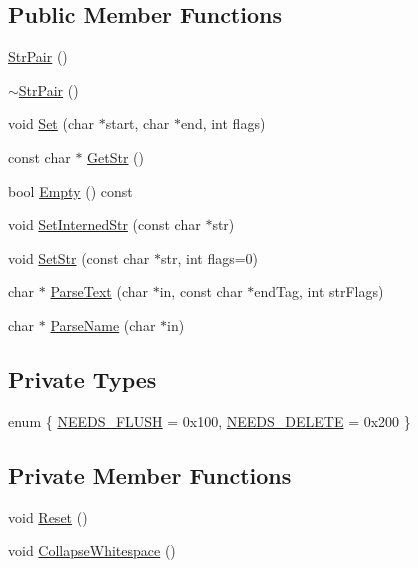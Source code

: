 \subsection*{Public Member Functions}
\begin{DoxyCompactItemize}
\item 
\hyperlink{classtinyxml2_1_1_str_pair_a69153963f7052de9f767d3d8c1623a70}{Str\-Pair} ()
\item 
\hyperlink{classtinyxml2_1_1_str_pair_a60bed84d2503296e1c2a73fcef1431f9}{$\sim$\-Str\-Pair} ()
\item 
void \hyperlink{classtinyxml2_1_1_str_pair_a4f05549373394266a1eecba26813c166}{Set} (char $\ast$start, char $\ast$end, int flags)
\item 
const char $\ast$ \hyperlink{classtinyxml2_1_1_str_pair_ad87e3d11330f5e689ba1e7e54c023b57}{Get\-Str} ()
\item 
bool \hyperlink{classtinyxml2_1_1_str_pair_affa1043e73a18f05d5d2faec055725a7}{Empty} () const 
\item 
void \hyperlink{classtinyxml2_1_1_str_pair_a2baf6230e18333e02ab65d0897ee3941}{Set\-Interned\-Str} (const char $\ast$str)
\item 
void \hyperlink{classtinyxml2_1_1_str_pair_a1f82ec6b5bee35ee7466d8565e43b1de}{Set\-Str} (const char $\ast$str, int flags=0)
\item 
char $\ast$ \hyperlink{classtinyxml2_1_1_str_pair_ad90521f188e9606a8fbafe5d86fb2246}{Parse\-Text} (char $\ast$in, const char $\ast$end\-Tag, int str\-Flags)
\item 
char $\ast$ \hyperlink{classtinyxml2_1_1_str_pair_aa6d8998efceba41d87ec2300c70a6085}{Parse\-Name} (char $\ast$in)
\end{DoxyCompactItemize}
\subsection*{Private Types}
\begin{DoxyCompactItemize}
\item 
enum \{ \hyperlink{classtinyxml2_1_1_str_pair_a476a92d76f24486c3ae4731916b12aaea2d8841daedc3955ed20ec9f760318434}{N\-E\-E\-D\-S\-\_\-\-F\-L\-U\-S\-H} = 0x100, 
\hyperlink{classtinyxml2_1_1_str_pair_a476a92d76f24486c3ae4731916b12aaeab9a3152ce5df9e7f4bbf3774fe862c75}{N\-E\-E\-D\-S\-\_\-\-D\-E\-L\-E\-T\-E} = 0x200
 \}
\end{DoxyCompactItemize}
\subsection*{Private Member Functions}
\begin{DoxyCompactItemize}
\item 
void \hyperlink{classtinyxml2_1_1_str_pair_a80c1b3bd99bf62ae85c94a29ce537125}{Reset} ()
\item 
void \hyperlink{classtinyxml2_1_1_str_pair_ade1469025e6b4cac74397a82a7429337}{Collapse\-Whitespace} ()
\end{DoxyCompactItemize}
